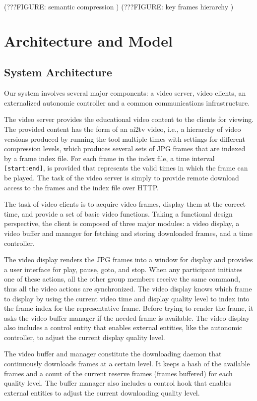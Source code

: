 \documentclass{sig-alternate}
\begin{document}
(???FIGURE: semantic compression )
(???FIGURE: key frames hierarchy )

\section{Architecture and Model} \label{design}
\subsection{System Architecture}
Our system involves several major components: a video server, video
clients, an externalized autonomic controller and a common
communications infrastructure.

The video server provides the educational video content to the clients
for viewing.  The provided content has the form of an ai2tv video,
i.e., a hierarchy of video versions produced by running the tool
multiple times with settings for different compression levels, which
produces several sets of JPG frames that are indexed by a frame index
file.  For each frame in the index file, a time interval
\texttt{[start:end]}, is provided that represents the valid times in
which the frame can be played.  The task of the video server is simply
to provide remote download access to the frames and the index file
over HTTP.

The task of video clients is to acquire video frames, display them at
the correct time, and provide a set of basic video functions.  Taking
a functional design perspective, the client is composed of three major
modules: a video display, a video buffer and manager for fetching and
storing downloaded frames, and a time controller.

The video display renders the JPG frames into a window for display and
provides a user interface for play, pause, goto, and stop.  When any
participant initiates one of these actions, all the other group
members receive the same command, thus all the video actions are
synchronized.  The video display knows which frame to display by using
the current video time and display quality level to index into the
frame index for the representative frame.  Before trying to render the
frame, it asks the video buffer manager if the needed frame is
available.  The video display also includes a control entity that
enables external entities, like the autonomic controller, to adjust
the current display quality level.

The video buffer and manager constitute the downloading daemon that
continuously downloads frames at a certain level.  It keeps a hash of
the available frames and a count of the current reserve frames (frames
buffered) for each quality level.  The buffer manager also includes a
control hook that enables external entities to adjust the current
downloading quality level.
\end{document}

